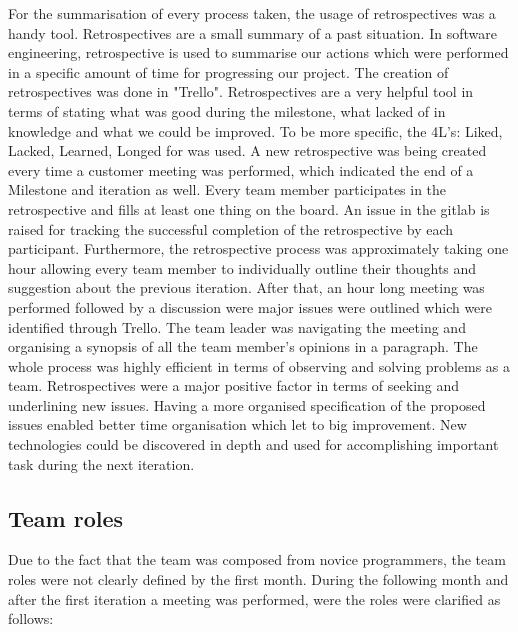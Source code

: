 \documentclass{l3proj}
\begin{document}
For the summarisation of every process taken, the usage of retrospectives was a handy tool. Retrospectives are a small summary of a past situation. In software engineering, retrospective is used to summarise our actions which were performed in a specific amount of time for progressing our project. The creation of retrospectives was done in "Trello". Retrospectives are a very helpful tool in terms of stating what was good during the milestone, what lacked of in knowledge and what we could be improved. To be more specific, the 4L's: Liked, Lacked, Learned, Longed for was used. A new retrospective was being created every time a customer meeting was performed, which indicated the end of a Milestone and iteration as well.  Every team member participates in the retrospective and fills at least one thing on the board. An issue in the gitlab is raised  for tracking the successful completion of the retrospective by each participant. Furthermore, the retrospective process was approximately taking one hour allowing every team member to individually outline their thoughts and suggestion about the previous iteration. After that, an hour long meeting was performed followed by a discussion were major issues were outlined which were identified through Trello. The team leader was navigating the meeting and organising a synopsis of all the team member's opinions in a paragraph. The whole process was highly efficient in terms of observing and solving problems as a team. Retrospectives were a major positive factor in terms of seeking and underlining new issues. Having a more organised specification of the proposed issues enabled better time organisation which let to big improvement. New technologies could be discovered in depth and used for accomplishing important task during the next iteration.

\subsection{Team roles}
\label{roles}

Due to the fact that the team was composed from novice programmers, the team roles were not clearly defined by the first month. During the following month and after the first iteration a meeting was performed, were the roles were clarified as follows:
\end{document}
